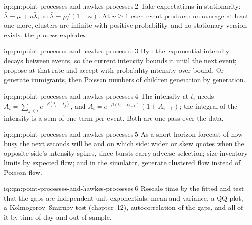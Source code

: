 \begin{solution}{iq:qm:point-processes-and-hawkes-processes:2}
Take expectations in stationarity: $\bar\lambda = \mu + n\bar\lambda$, so $\bar\lambda = \mu/(1 - n)$. At $n \ge 1$ each event produces on
average at least one more, clusters are infinite with positive probability, and no stationary version
exists: the process explodes.
\end{solution}

\begin{solution}{iq:qm:point-processes-and-hawkes-processes:3}
By : the exponential intensity decays between events, so the current intensity bounds it until the
next event; propose at that rate and accept with probability intensity over bound. Or generate immigrants,
then Poisson numbers of children generation by generation.
\end{solution}

\begin{solution}{iq:qm:point-processes-and-hawkes-processes:4}
The intensity at $t_i$ needs $A_i = \sum_{j<i}e^{-\beta(t_i - t_j)}$, and $A_i = e^{-\beta(t_i - t_{i-1})}(1 + A_{i-1})$; the integral
of the intensity is a sum of one term per event. Both are one pass over the data.
\end{solution}

\begin{solution}{iq:qm:point-processes-and-hawkes-processes:5}
As a short-horizon forecast of how busy the next seconds will be and on which side: widen or skew quotes when the
opposite side's intensity spikes, since bursts carry adverse selection; size inventory limits by expected
flow; and in the simulator, generate clustered flow instead of Poisson flow.
\end{solution}

\begin{solution}{iq:qm:point-processes-and-hawkes-processes:6}
Rescale time by the fitted  and test that the gaps are independent unit exponentials: mean and
variance, a QQ plot, a Kolmogorov--Smirnov test (chapter~12), autocorrelation of the gaps, and all of it by time
of day and out of sample.
\end{solution}
